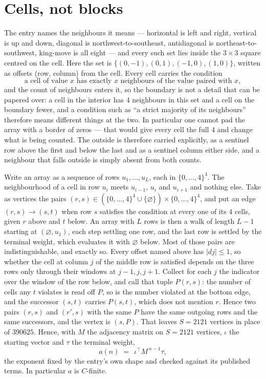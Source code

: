 \documentclass[11pt,a4paper]{article}
\theoremstyle{plain}
\theoremstyle{definition}
\begin{document}
\section{Cells, not blocks}

The entry names the neighbours it means --- horizontal is left and right, vertical is up and
down, diagonal is northwest-to-southeast, antidiagonal is northeast-to-southwest, king-move is
all eight --- and every such set lies inside the $3\times3$ square centred on the cell. Here
the set is $\{(0,-1), (0,1), (-1,0), (1,0)\}$, written as offsets (row, column) from the cell. Every cell carries
the condition
\[
\text{a cell of value }x\text{ has exactly }x\text{ neighbours of the value paired with }x,
\]
and the count of neighbours enters it, so the boundary is not a detail that can be papered
over: a cell in the interior has $4$ neighbours in this set and a cell on the boundary
fewer, and a condition such as ``a strict majority of its neighbours'' therefore means
different things at the two. In particular one cannot pad the array with a border of zeros ---
that would give every cell the full $4$ and change what is being counted. The outside is
therefore carried
explicitly, as a sentinel row above the first and below the last and as a sentinel column
either side, and a neighbour that falls outside is simply absent from both counts.

Write an array as a sequence of rows $u_1,\dots,u_L$, each in
$\{0,\dots,4\}^{4}$. The neighbourhood of a cell in row $u_i$ meets $u_{i-1}$,
$u_i$ and $u_{i+1}$ and nothing else. Take as vertices the pairs
$(r,s)\in(\{0,\dots,4\}^{4}\cup\{\varnothing\})\times\{0,\dots,4\}^{4}$,
and put an edge $(r,s)\to(s,t)$ when row $s$ satisfies the condition at every one of its
$4$ cells, given $r$ above and $t$ below. An array with $L$ rows is then a walk of length
$L-1$ starting at $(\varnothing,u_1)$, each step settling one row, and the last row is
settled by the terminal weight, which evaluates it with $\varnothing$ below. Most of those pairs are indistinguishable, and exactly so. Every offset named above has $|dj|\le 1$, so whether the cell at column $j$ of the middle row is satisfied depends on the three rows only through their windows at $j-1,j,j+1$. Collect for each $j$ the indicator over the window of the row below, and call that tuple $P(r,s)$: the number of cells any $t$ violates is read off $P$, so is the number violated at the bottom edge, and the successor $(s,t)$ carries $P(s,t)$, which does not mention $r$. Hence two pairs $(r,s)$ and $(r',s)$ with the same $P$ have the same outgoing rows and the same successors, and the vertex is $(s,P)$. That leaves $S=2121$ vertices in place of $390625$. Hence,
with $M$ the adjacency matrix on $S=2121$ vertices, $\iota$ the starting vector and $\tau$ the
terminal weight,
\[
a(n)\;=\;\,\iota^{\!\top}M^{\,n-1}\tau ,
\]
the exponent fixed by the entry's own shape and checked against its published terms. In
particular $a$ is $C$-finite.
\end{document}
